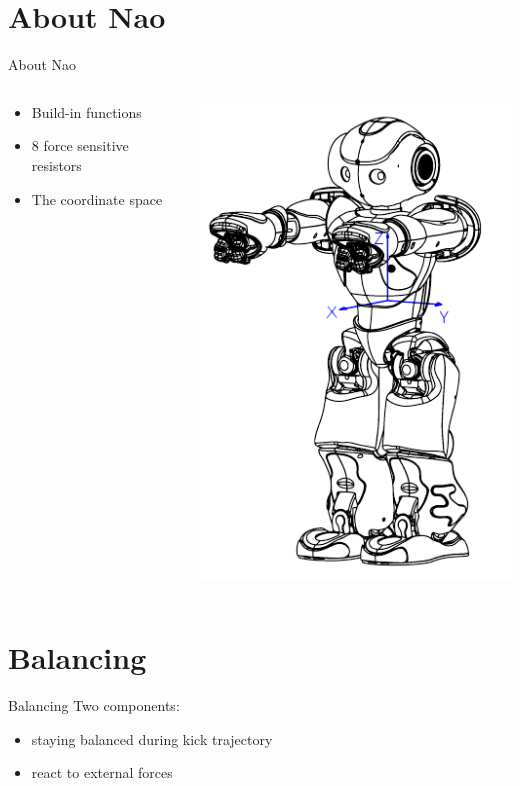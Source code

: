 \documentclass{beamer}
\begin{document}
\section{About Nao}
\begin{frame}{About Nao}
\begin{columns}[T]
    \begin{column}{.5\textwidth}
	\vspace{20 mm}
	\begin{itemize}
		\item Build-in functions
	   	\item 8 force sensitive resistors
		\item The coordinate space
	\end{itemize}	
    \end{column}
    \begin{column}{.5\textwidth}

    \includegraphics[scale=0.5]{pics/hardware_inertialunit.png}

    \end{column}
  \end{columns}
\end{frame}

\section{Balancing}
\begin{frame}{Balancing}
  Two components:
  \begin{itemize}
    \item staying balanced during kick trajectory
    \item react to external forces
  \end{itemize}
\end{frame}
\end{document}
